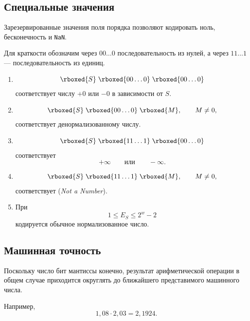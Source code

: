 \documentclass[../final.tex]{subfiles}
\begin{document}
\subsection{Специальные значения}

Зарезервированные значения поля порядка позволяют кодировать
ноль, бесконечность и \texttt{NaN}.

Для краткости обозначим через $00\ldots0$ последовательность из нулей,
а через $11\ldots1$ --- последовательность из единиц.

\begin{enumerate}
    \item
    \[
        \rboxed{S}\;
        \rboxed{00\ldots0}\;
        \rboxed{00\ldots0}
    \]
    соответствует числу $+0$ или $-0$ в зависимости от $S$.

    \item
    \[
        \rboxed{S}\;
        \rboxed{00\ldots0}\;
        \rboxed{M},
        \qquad
        M\neq0,
    \]
    соответствует денормализованному числу.

    \item
    \[
        \rboxed{S}\;
        \rboxed{11\ldots1}\;
        \rboxed{00\ldots0}
    \]
    соответствует
    \[
        +\infty
        \qquad\text{или}\qquad
        -\infty.
    \]

    \item
    \[
        \rboxed{S}\;
        \rboxed{11\ldots1}\;
        \rboxed{M},
        \qquad
        M\neq0,
    \]
    соответствует  (\textit{Not a Number}).

    \item При
    \[
        1\leq E_S\leq2^w-2
    \]
    кодируется обычное нормализованное число.
\end{enumerate}


\subsection{Машинная точность}

Поскольку число бит мантиссы конечно, результат арифметической
операции в общем случае приходится округлять до ближайшего
представимого машинного числа.

Например,
%
\[
    1{,}08\cdot2{,}03
    =
    2{,}1924.
\]
\end{document}
